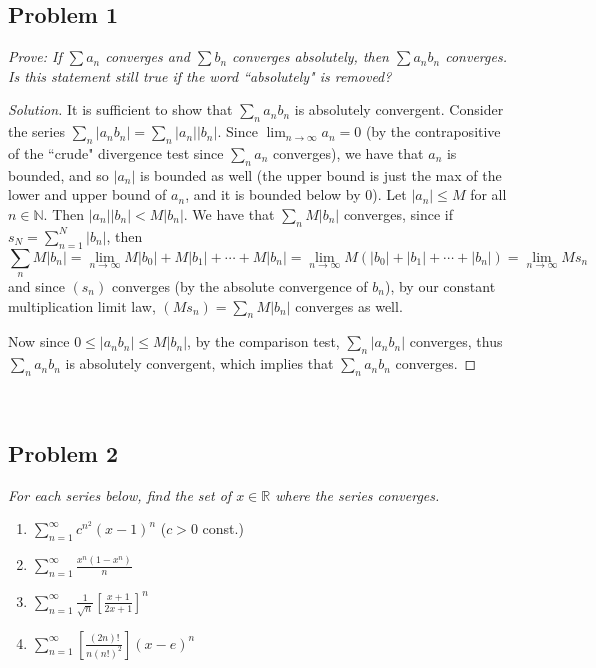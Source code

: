 \documentclass{article}
\newcommand{\N}{{\mathbb N}}
\newcommand{\R}{{\mathbb R}}
\begin{document}
\subsection*{Problem 1}
{\it Prove: If $\sum a_n$ converges and $\sum b_n$ converges absolutely,
then $\sum a_nb_n$ converges.
Is this statement still true if the word ``absolutely" is removed?}

\begin{proof}[Solution]\let\qed\relax
	It is sufficient to show that $\sum_n a_nb_n$ is absolutely convergent.
	Consider the series $\sum_n|a_nb_n| = \sum_n|a_n||b_n|$.
	Since $\lim_{n\to\infty} a_n = 0$
	(by the contrapositive of the ``crude" divergence test since $\sum_n a_n$ converges),
	we have that $a_n$ is bounded,
	and so $|a_n|$ is bounded as well
	(the upper bound is just the max of the lower and upper bound of $a_n$,
	and it is bounded below by $0$).
	Let $|a_n| \leq M$ for all $n \in \N$.
	Then $|a_n||b_n| < M|b_n|$.
	We have that $\sum_n M|b_n|$ converges,
	since if $s_N = \sum_{n=1}^N |b_n|$, then
	\[
		\sum_n M|b_n| = \lim_{n\to\infty} M|b_0| + M|b_1| + \cdots + M|b_n|
		= \lim_{n\to\infty} M(|b_0| + |b_1| + \cdots + |b_n|)
		= \lim_{n\to\infty} Ms_n
	\]
	and since $(s_n)$ converges (by the absolute convergence of $b_n$),
	by our constant multiplication limit law, $(Ms_n) = \sum_nM|b_n|$
	converges as well.

	Now since $0 \leq |a_nb_n| \leq M|b_n|$,
	by the comparison test, $\sum_n |a_nb_n|$ converges,
	thus $\sum_n a_nb_n$ is absolutely convergent,
	which implies that $\sum_n a_nb_n$ converges.
\end{proof}
\clearpage
~\clearpage

\subsection*{Problem 2}
{\it For each series below, find the set of $x \in \R$ where the series converges.
\begin{enumerate}
	\item $\sum_{n=1}^\infty c^{n^2}(x-1)^n$ ($c > 0$ const.)
	\item $\sum_{n=1}^\infty \frac{x^n(1-x^n)}{n}$
	\item $\sum_{n=1}^\infty \frac{1}{\sqrt{n}}\left[\frac{x+1}{2x+1}\right]^n$
	\item $\sum_{n=1}^\infty \left[\frac{(2n)!}{n(n!)^2}\right](x-e)^n$
\end{enumerate}}
\end{document}
